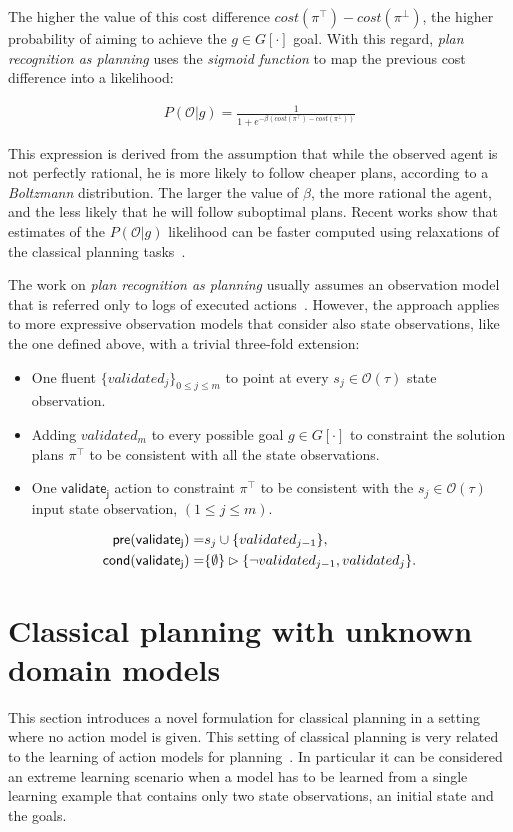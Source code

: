 \documentclass{article}
\newcommand{\pre}{\mathsf{pre}}     %
\newcommand{\cond}{\mathsf{cond}}   %
\begin{document}
The higher the value of this cost difference $cost(\pi^\top)-cost(\pi^\bot)$, the higher probability of aiming to achieve the $g\in G[\cdot]$ goal. With this regard, {\em plan recognition as planning} uses the {\em sigmoid function} to map the previous cost difference into a likelihood:

\begin{align}
P(\mathcal{O}|g) = \frac{1}{1+e^{-\beta(cost(\pi^\top)-cost(\pi^\bot))}}
\end{align}

This expression is derived from the assumption that while the observed agent is not perfectly rational, he is more likely to follow cheaper plans, according to a {\em Boltzmann} distribution. The larger the value of $\beta$, the more rational the agent, and the less likely that he will follow suboptimal plans. Recent works show that estimates of the $P(\mathcal{O}|g)$ likelihood can be faster computed using relaxations of the classical planning tasks~\cite{pereira2017landmark}.

The work on {\em plan recognition as planning} usually assumes an observation model that is referred only to logs of executed actions~\cite{ramirez2009plan}. However, the approach applies to more expressive observation models that consider also state observations, like the one defined above, with a trivial three-fold extension:
\begin{itemize}
\item One fluent $\{validated_j\}_{0\leq j\leq m}$ to point at every $s_j\in\mathcal{O}(\tau)$ state observation.
\item Adding $validated_m$ to every possible goal $g\in G[\cdot]$ to constraint the solution plans $\pi^\top$ to be consistent with all the state observations.
\item One $\mathsf{validate_{j}}$ action to constraint $\pi^\top$ to be consistent with the $s_j\in\mathcal{O}(\tau)$ input state observation, {\small $(1\leq j\leq m)$}.  
\end{itemize}
\begin{small}
\begin{align*}
\hspace*{7pt}\pre(\mathsf{validate_{j}})=&s_j\cup\{validated_{j-1}\},\\
\cond(\mathsf{validate_{j}})=&\{\emptyset\}\rhd\{\neg validated_{j-1}, validated_j\}.
\end{align*}
\end{small}


\section{Classical planning with unknown domain models}
\label{sec:planning}
This section introduces a novel formulation for classical planning in a setting where no action model is given. This setting of classical planning is very related to the learning of action models for planning~\cite{SternJ17}. In particular it can be considered an extreme learning scenario when a model has to be learned from a single learning example that contains only two state observations, an initial state and the goals.
\end{document}
